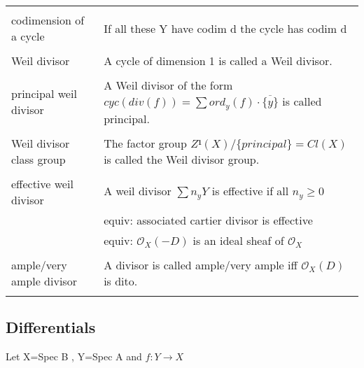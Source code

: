 \documentclass[a4paper, 12pt]{article}
\newcommand{\ox}{\mathcal{O}_X}
\begin{document}
\begin{longtable}{p{}  p{} }
    &\\

    codimension of a cycle & If all these Y have codim d the cycle has codim d\\

    &\\

    Weil divisor & A cycle of dimension 1 is called a Weil divisor.\\

    &\\
    
  



	principal weil divisor & A Weil divisor of the form $cyc(div(f)) = \sum ord_y(f)\cdot\overline{\{y\}}$ is called principal.\\
	
	&\\
	
	Weil divisor class group& The factor group $Z¹(X)/\{principal\} = Cl(X)$ is called the Weil divisor group. \\

	&\\

	effective weil divisor& A weil divisor $\sum n_y Y$ is effective if all $n_y \geq 0$\\
	& equiv: associated cartier divisor is effective\\
	& equiv: $\ox(-D)$ is an ideal sheaf of $\ox$\\
	
	&\\
	
	ample/very ample divisor & A divisor is called ample/very ample iff $\ox(D)$ is dito.\\
	
	&\\
	
		
\end{longtable}


\subsection{Differentials}

Let X=Spec B , Y=Spec A and $f:Y\longrightarrow X$ \\
\end{document}
